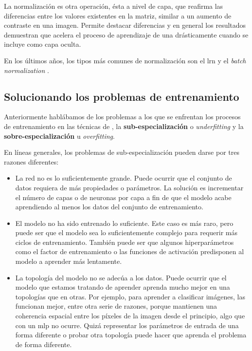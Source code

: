 La normalización es otra operación, ésta a nivel de capa, que reafirma las diferencias entre los valores existentes en la matriz, similar a un aumento de contraste en una imagen. Permite destacar diferencias y en general los resultados demuestran que acelera el proceso de aprendizaje de una  drásticamente cuando se incluye como capa oculta.

En los últimos años, los tipos más comunes de normalización son el \gls{lrn} \cite{robinson2007explaining} y el \textit{batch normalization} \cite{ioffe2015batch}.

\subsection{Solucionando los problemas de entrenamiento}

Anteriormente hablábamos de los problemas a los que se enfrentan los procesos de entrenamiento en las técnicas de , la \textbf{sub-especialización} o \textit{underfitting} y la \textbf{sobre-especialización} u \textit{overfitting}.

En líneas generales, los problemas de sub-especialización pueden darse por tres razones diferentes:

\begin{itemize}
	\item La red no es lo suficientemente grande. Puede ocurrir que el conjunto de datos requiera de más propiedades o parámetros. La solución es incrementar el número de capas o de neuronas por capa a fin de que el modelo acabe aprendiendo al menos los datos del conjunto de entrenamiento.
	\item El modelo no ha sido entrenado lo suficiente. Este caso es más raro, pero puede ser que el modelo sea lo suficientemente complejo para requerir más ciclos de entrenamiento. También puede ser que algunos hiperparámetros como el factor de entrenamiento o las funciones de activación predisponen al modelo a aprender más lentamente.
	\item La topología del modelo no se adecúa a los datos. Puede ocurrir que el modelo que estamos tratando de aprender aprenda mucho mejor en una topologías que en otras. Por ejemplo, para aprender a clasificar imágenes, las  funcionan mejor, entre otra serie de razones, porque mantienen una coherencia espacial entre los píxeles de la imagen desde el principio, algo que con un \gls{mlp} no ocurre. Quizá representar los parámetros de entrada de una forma diferente o probar otra topología puede hacer que aprenda el problema de forma diferente.
\end{itemize}

